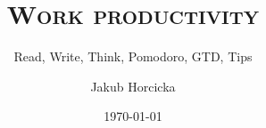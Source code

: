 \documentclass[xcolor=dvipsnames]{beamer}
\author{Jakub Horcicka}
\title{\textsc{Work productivity}}
\subtitle{Read, Write, Think, Pomodoro, GTD, Tips}
\date{\today}
\begin{document}
 
  \begin{frame}
    \titlepage
  \end{frame}

  
  
  
  
  
\end{document}
